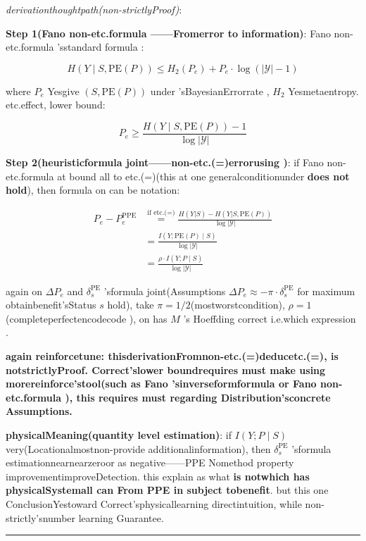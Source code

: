 \documentclass[
  12pt,
]{article}
\begin{document}
\emph{derivationthoughtpath(non-strictlyProof)}: 

\textbf{Step 1(Fano non-etc.formula ------Fromerror to information)}: Fano
non-etc.formula 'sstandard formula : 

\[H(Y \mid S, \text{PE}(P)) \leq H_2(P_e) + P_e \cdot \log(|\mathcal{Y}| - 1)\]

where \(P_e\) Yesgive  \((S, \text{PE}(P))\) under 'sBayesianErrorrate , \(H_2\)
Yesmetaentropy. etc.effect, lower bound: 

\[P_e \geq \frac{H(Y \mid S, \text{PE}(P)) - 1}{\log |\mathcal{Y}|}\]

\textbf{Step 2(heuristicformula joint------non-etc.(=)errorusing )}: if  Fano
non-etc.formula at bound all to etc.(=)(this at one generalconditionunder \textbf{does not hold}), then formula on can be notation: 

\begin{align*}
P_e - P_e^{\text{PPE}} &\stackrel{\text{if etc.(=)}}{=} \frac{H(Y|S) - H(Y|S, \text{PE}(P))}{\log |\mathcal{Y}|} \\
&= \frac{I(Y; \text{PE}(P) \mid S)}{\log |\mathcal{Y}|} \\
&= \frac{\rho \cdot I(Y; P \mid S)}{\log |\mathcal{Y}|}
\end{align*}

again on  \(\Delta P_e\) and  \(\delta_s^{\text{PE}}\) 'sformula joint(Assumptions
\(\Delta P_e \approx -\pi \cdot \delta_s^{\text{PE}}\) for maximum obtainbenefit'sStatus
\(s\) hold), take
\(\pi = 1/2\)(mostworstcondition), \(\rho = 1\)(completeperfectencodecode ), on has  \(M\) 's
Hoeffding correct i.e.which  expression . 

\textbf{again reinforcetune: thisderivationFromnon-etc.(=)deducetc.(=), is notstrictlyProof. Correct'slower boundrequires must make using morereinforce'stool(such as 
Fano 'sinverseformformula or  Fano non-etc.formula ), this requires must regarding Distribution'sconcrete Assumptions. }

\textbf{physicalMeaning(quantity level estimation)}: if  \(I(Y; P \mid S)\)
very(Locationalmostnon-provide additionalinformation), then  \(\delta_s^{\text{PE}}\)
'sformula estimationnearnearzeroor as negative------PPE
Nomethod property improvementimproveDetection. this explain as what \textbf{is notwhich has physicalSystemall can From PPE
in subject tobenefit}. but this one ConclusionYestoward Correct'sphysicallearning directintuition, while non-strictly'snumber learning Guarantee. 

\begin{center}\rule{0.5\linewidth}{0.5pt}\end{center}
\end{document}
